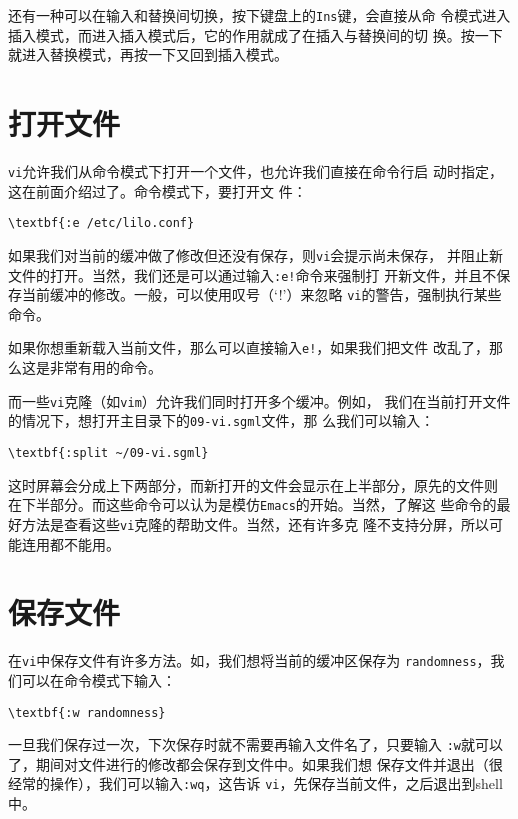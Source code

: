 还有一种可以在输入和替换间切换，按下键盘上的\texttt{Ins}键，会直接从命
令模式进入插入模式，而进入插入模式后，它的作用就成了在插入与替换间的切
换。按一下就进入替换模式，再按一下又回到插入模式。

\section{打开文件}
\label{sec:vi:open}
\texttt{vi}允许我们从命令模式下打开一个文件，也允许我们直接在命令行启
动时指定，这在前面介绍过了。命令模式下，要打开文
件：
\begin{Verbatim}[frame=single,commandchars=\\\{\}]
\textbf{:e /etc/lilo.conf}
\end{Verbatim}
如果我们对当前的缓冲做了修改但还没有保存，则\texttt{vi}会提示尚未保存，
并阻止新文件的打开。当然，我们还是可以通过输入\texttt{:e!}命令来强制打
开新文件，并且不保存当前缓冲的修改。一般，可以使用叹号（`!'）来忽略
\texttt{vi}的警告，强制执行某些命令。

如果你想重新载入当前文件，那么可以直接输入\texttt{e!}，如果我们把文件
改乱了，那么这是非常有用的命令。

而一些\texttt{vi}克隆（如\texttt{vim}）允许我们同时打开多个缓冲。例如，
我们在当前打开文件的情况下，想打开主目录下的\texttt{09-vi.sgml}文件，那
么我们可以输入：
\begin{Verbatim}[frame=single,commandchars=\\\{\}]
\textbf{:split ~/09-vi.sgml}
\end{Verbatim}

这时屏幕会分成上下两部分，而新打开的文件会显示在上半部分，原先的文件则
在下半部分。而这些命令可以认为是模仿\texttt{Emacs}的开始。当然，了解这
些命令的最好方法是查看这些\texttt{vi}克隆的帮助文件。当然，还有许多克
隆不支持分屏，所以可能连用都不能用。

\section{保存文件}
\label{sec:vi:save}
在\texttt{vi}中保存文件有许多方法。如，我们想将当前的缓冲区保存为
\texttt{randomness}，我们可以在命令模式下输入：
\begin{Verbatim}[frame=single,commandchars=\\\{\}]
\textbf{:w randomness}
\end{Verbatim}

一旦我们保存过一次，下次保存时就不需要再输入文件名了，只要输入
\texttt{:w}就可以了，期间对文件进行的修改都会保存到文件中。如果我们想
保存文件并退出（很经常的操作），我们可以输入\texttt{:wq}，这告诉
\texttt{vi}，先保存当前文件，之后退出到shell中。

